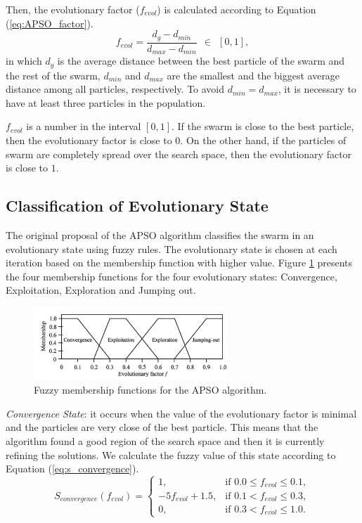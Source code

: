 Then, the evolutionary factor ($f_{evol}$) is calculated according to Equation (\ref{eq:APSO_factor}).
\begin{equation}\label{eq:APSO_factor}
f_{evol} = \frac{d_g - d_{min}}{d_{max} - d_{min}} \ \  \in \ \ [0,1],
\end{equation}
in which $d_g$ is the average distance between the best particle of the swarm and the rest of the swarm, $d_{min}$ and $d_{max}$ are the smallest and the biggest average distance among all particles, respectively. To avoid $d_{min} = d_{max}$, it is necessary to have at least three particles in the population.

$f_{evol}$ is a number in the interval $[0,1]$. If the swarm is close to the best particle, then the evolutionary factor is close to $0$. On the other hand, if the particles of swarm are completely spread over the search space, then the evolutionary factor is close to $1$.

\subsection{Classification of Evolutionary State}
The original proposal of the APSO algorithm classifies the swarm in an evolutionary state using fuzzy rules. The evolutionary state is chosen at each iteration based on the membership function with higher value. Figure \ref{fig:factor_APSO} presents the four membership functions for the four evolutionary states: Convergence, Exploitation, Exploration and Jumping out.

\begin{figure}[!h]
\centering
 \includegraphics[width=0.65\textwidth]{image/factor}
 \caption{\small{Fuzzy membership functions for the APSO algorithm.}}
 \label{fig:factor_APSO}
\end{figure}

\emph{Convergence State}: it occurs when the value of the evolutionary factor is minimal and the particles are very close of the best particle. This means that the algorithm found a good region of the search space and then it is currently refining the solutions. We calculate the fuzzy value of this state according to Equation (\ref{eq:s_convergence}).
\begin{equation}
S_{convergence}(f_{evol}) = \begin{cases}
1,                 & \mbox{if $0.0 \leq f_{evol} \leq 0.1$}, \\
-5f_{evol} + 1.5,  & \mbox{if $0.1    < f_{evol} \leq 0.3$}, \\
0,                 & \mbox{if $0.3    < f_{evol} \leq 1.0$}.
\end{cases}
\label{eq:s_convergence}
\end{equation}

